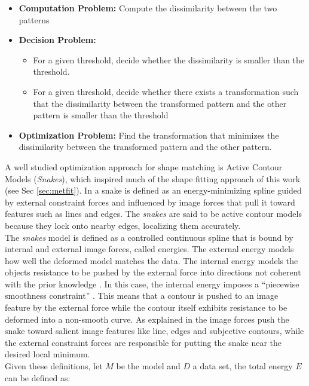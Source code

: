 \begin{itemize}
\item \textbf{Computation Problem: }Compute the dissimilarity
  between the two patterns
\item \textbf{Decision Problem: }
  \begin{itemize}
  \item  For a given threshold, decide
  whether the dissimilarity is smaller than the threshold.
  \item For a given threshold, decide
    whether there exists a transformation such that the
    dissimilarity between the transformed pattern and the other 
    pattern is smaller than the threshold
  \end{itemize}
 
\item \textbf{Optimization Problem: }Find the transformation
that minimizes the dissimilarity between the transformed
pattern and the other pattern.
\end{itemize}

A well studied optimization approach for shape matching is
Active Contour Models (\emph{Snakes}),  which inspired much 
of the shape fitting approach of this work 
(see Sec \ref{sec:metfit}). In \cite{snakes} a snake is defined 
as an energy-minimizing spline guided by external constraint
forces and influenced by image forces that pull it toward 
features such as lines and edges. The \emph{snakes} are said to
be active contour models because they lock onto nearby edges,
localizing them accurately.\\
The \emph{snakes} model is defined as a controlled continuous spline that is bound
by internal and external image forces, called energies. The external energy models how well
the deformed model matches the data. The internal energy models
the objects resistance to be pushed by the external force into directions not coherent
with the prior knowledge \cite{deformable}. In this case, the internal energy  imposes 
a ``piecewise smoothness constraint'' \cite{snakes}. This means that a contour is
pushed to an image feature by the external force while the contour itself exhibits resistance
to be deformed into a non-smooth curve. As explained in \cite{deformable} the image forces push the snake toward
salient image features like line, edges and subjective contours, while the external constraint forces
are responsible for putting the snake near the desired local minimum.\\

Given these definitions, let $M$ be the model and $D$ a data set, 
the total energy $E$ can be defined as:

